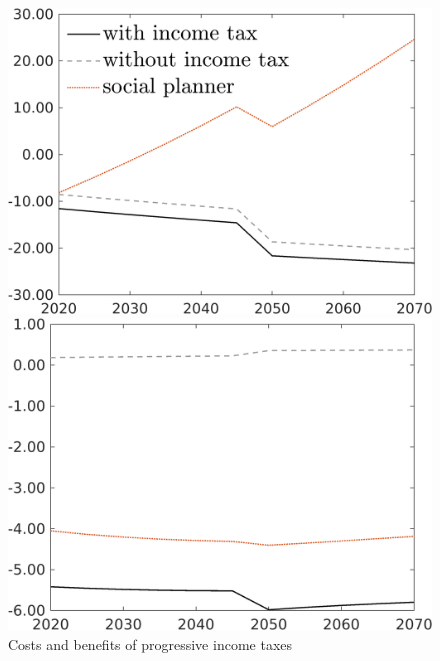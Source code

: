\begin{figure}[h!!!]
	\centering
	\caption{Costs and benefits of progressive income taxes %
	}\label{fig:optAll_percLf_dyn}
	\begin{minipage}[]{0.32\textwidth}
		\includegraphics[width=1\textwidth]{../../codding_model/own_basedOnFried/optimalPol_010922_revision/figures/all_13Sept22_Tplus30/C_PercentageLFDynNT_Target_regime0_spillover0_noskill0_sep0_xgrowth0_PV1_etaa0.79_lgd1.png}
	\end{minipage}
	\begin{minipage}[]{0.32\textwidth}
		\includegraphics[width=1\textwidth]{../../codding_model/own_basedOnFried/optimalPol_010922_revision/figures/all_13Sept22_Tplus30/hh_PercentageLFDynNT_Target_regime0_spillover0_noskill0_sep0_xgrowth0_PV1_etaa0.79_lgd0.png}

\end{minipage}
\end{figure}
